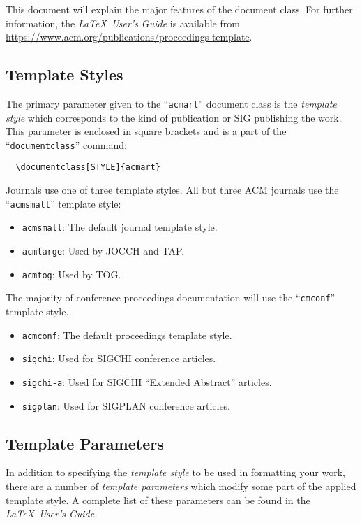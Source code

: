\documentclass[manuscript,screen]{acmart}
\providecommand{\tightlist}{%
  \setlength{\itemsep}{0pt}\setlength{\parskip}{0pt}}\usepackage{longtable,booktabs,array}
\begin{document}
This document will explain the major features of the document class. For
further information, the \emph{\LaTeX~User's Guide} is available from
\url{https://www.acm.org/publications/proceedings-template}.

\subsection{Template Styles}\label{template-styles}

The primary parameter given to the ``\texttt{acmart}'' document class is
the \emph{template style} which corresponds to the kind of publication
or SIG publishing the work. This parameter is enclosed in square
brackets and is a part of the ``\texttt{documentclass}'' command:

\begin{verbatim}
  \documentclass[STYLE]{acmart}
\end{verbatim}

Journals use one of three template styles. All but three ACM journals
use the ``\texttt{acmsmall}'' template style:

\begin{itemize}
\tightlist
\item
  \texttt{acmsmall}: The default journal template style.
\item
  \texttt{acmlarge}: Used by JOCCH and TAP.
\item
  \texttt{acmtog}: Used by TOG.
\end{itemize}

The majority of conference proceedings documentation will use the
``\texttt{cmconf}'' template style.

\begin{itemize}
\tightlist
\item
  \texttt{acmconf}: The default proceedings template style.
\item
  \texttt{sigchi}: Used for SIGCHI conference articles.
\item
  \texttt{sigchi-a}: Used for SIGCHI ``Extended Abstract'' articles.
\item
  \texttt{sigplan}: Used for SIGPLAN conference articles.
\end{itemize}

\subsection{Template Parameters}\label{template-parameters}

In addition to specifying the \emph{template style} to be used in
formatting your work, there are a number of \emph{template parameters}
which modify some part of the applied template style. A complete list of
these parameters can be found in the \emph{\LaTeX~User's Guide.}
\end{document}
